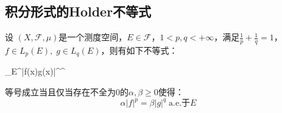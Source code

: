 \subsection{积分形式的Holder不等式}
\begin{theorem}
	设	$(X,\mathscr{F},\mu)$是一个测度空间，$E\in\mathscr{F}$，$1<p,q<+\infty$，满足$\frac{1}{p}+\frac{1}{q}=1$，$f\in L_p(E),\;g\in L_q(E)$，则有如下不等式：
	\begin{inequality*}\label{ineq:holder-ineq-Lebesgue}
		\int_{E}^{}|f(x)g(x)|\dif \mu\leqslant{}^{}^{}
	\end{inequality*}
	等号成立当且仅当存在不全为$0$的$\alpha,\beta\geqslant0$使得：
	\begin{equation*}
		\alpha|f|^p=\beta|g|^q\;\text{a.e.于$E$}
	\end{equation*}
\end{theorem}
